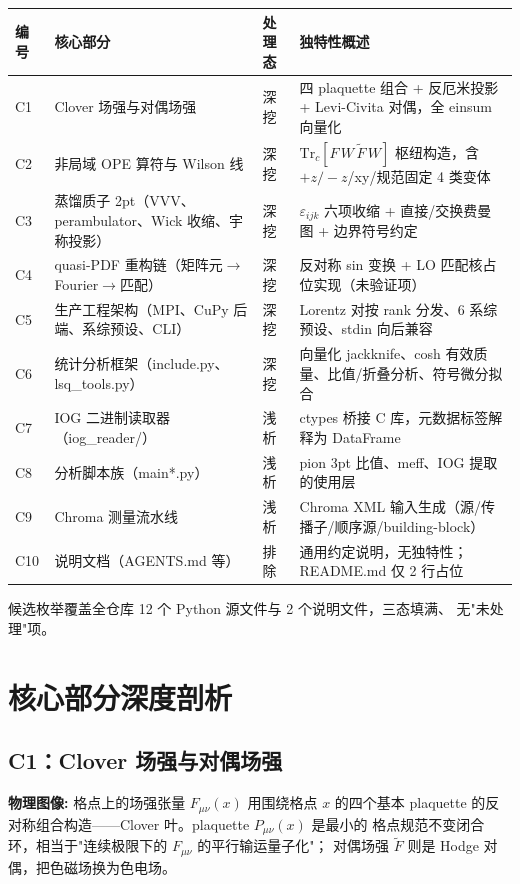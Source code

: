 \documentclass[UTF8]{ctexart}
\begin{document}
\begin{xltabular}{\textwidth}{lllX}
\toprule
\textcolor{algo}{编号} & 核心部分 & 处理态 & 独特性概述 \\
\midrule
\endhead
C1 & Clover 场强与对偶场强 & 深挖 &
四 plaquette 组合 + 反厄米投影 + Levi-Civita 对偶，全 einsum 向量化 \\
C2 & 非局域 OPE 算符与 Wilson 线 & 深挖 &
$\mathrm{Tr}_c[F\,W\,\tilde{F}\,W]$ 枢纽构造，含 $+z/-z$/xy/规范固定 4 类变体 \\
C3 & 蒸馏质子 2pt（VVV、perambulator、Wick 收缩、宇称投影） & 深挖 &
$\varepsilon_{ijk}$ 六项收缩 + 直接/交换费曼图 + 边界符号约定 \\
C4 & quasi-PDF 重构链（矩阵元$\to$Fourier$\to$匹配） & 深挖 &
反对称 sin 变换 + LO 匹配核占位实现（未验证项） \\
C5 & 生产工程架构（MPI、CuPy 后端、系综预设、CLI） & 深挖 &
Lorentz 对按 rank 分发、6 系综预设、stdin 向后兼容 \\
C6 & 统计分析框架（include.py、lsq\_tools.py） & 深挖 &
向量化 jackknife、cosh 有效质量、比值/折叠分析、符号微分拟合 \\
C7 & IOG 二进制读取器（iog\_reader/） & 浅析 &
ctypes 桥接 C 库，元数据标签解释为 DataFrame \\
C8 & 分析脚本族（main*.py） & 浅析 &
pion 3pt 比值、meff、IOG 提取的使用层 \\
C9 & Chroma 测量流水线 & 浅析 &
Chroma XML 输入生成（源/传播子/顺序源/building-block） \\
C10 & 说明文档（AGENTS.md 等） & 排除 &
通用约定说明，无独特性；README.md 仅 2 行占位 \\
\bottomrule
\end{xltabular}

候选枚举覆盖全仓库 12 个 Python 源文件与 2 个说明文件，三态填满、
无"未处理"项。

\section{核心部分深度剖析}

\subsection{C1：Clover 场强与对偶场强}

\begin{physbox}
\textbf{物理图像:} 格点上的场强张量 $F_{\mu\nu}(x)$ 用围绕格点 $x$ 的四个基本
plaquette 的反对称组合构造——Clover 叶。plaquette $P_{\mu\nu}(x)$ 是最小的
格点规范不变闭合环，相当于"连续极限下的 $F_{\mu\nu}$ 的平行输运量子化"；
对偶场强 $\tilde{F}$ 则是 Hodge 对偶，把色磁场换为色电场。
\end{physbox}
\end{document}
